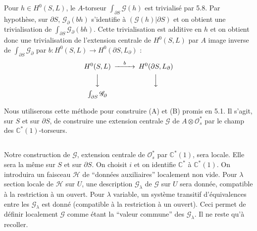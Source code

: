 \documentclass[12pt,a4paper]{article}
\theoremstyle{plain}
\theoremstyle{definition}
\theoremstyle{remark}
\newcommand{\cO}{\mathcal{O}}
\newcommand{\C}{\mathbb{C}}
\providecommand{\cO}{\mathcal{O}}
\begin{document}
Pour $h \in H^0(S, L)$, le $A$-torseur $\int_{\partial S} \mathscr{G}(h)$ est trivialisé par 5.8. Par hypothèse,
sur $\partial S$, $\mathscr{G}_\partial(bh)$ s'identifie à $(\mathscr{G}(h)|\partial S)$ et on obtient une trivialisation de $\int_{\partial S} \mathscr{G}_\partial(bh)$.
Cette trivialisation est additive en $h$ et on obtient donc une trivialisation de l'extension
centrale de $H^0(S, L)$ par $A$ image inverse de $\int_{\partial S} \mathscr{G}_\partial$ par $b : H^0(S, L) \to H^0(\partial S, L_\partial)$ :
\[
\begin{CD}
H^0(S, L) @>{b}>> H^0(\partial S, L_\partial) \\
@VVV @VVV \\
\int_{\partial S} \mathscr{G}_\partial
\end{CD}
\]

Nous utiliserons cette méthode pour construire (A) et (B) promis en 5.1. Il s'agit,
sur $S$ et sur $\partial S$, de construire une extension centrale $\mathscr{G}$ de $A \otimes \cO_s^*$ par le champ des
$\C^*(1)$-torseurs.

\subsection{}

Notre construction de $\mathscr{G}$, extension centrale de $\cO_s^*$ par $\C^*(1)$, sera locale.
Elle sera la même sur $S$ et sur $\partial S$. On choisit $i$ et on identifie $\C^*$ à $\C^*(1)$. On introduira
un faisceau $\mathscr{H}$ de ``données auxiliaires'' localement non vide. Pour $\lambda$ section locale de $\mathscr{H}$
sur $U$, une description $\mathscr{G}_\lambda$ de $\mathscr{G}$ sur $U$ sera donnée, compatible à la restriction à un
ouvert. Pour $\lambda$ variable, un système transitif d'équivalences entre les $\mathscr{G}_\lambda$ est donné (compatible à la restriction à un ouvert). Ceci permet de définir localement $\mathscr{G}$ comme étant la
``valeur commune'' des $\mathscr{G}_\lambda$. Il ne reste qu'à recoller.
\end{document}

